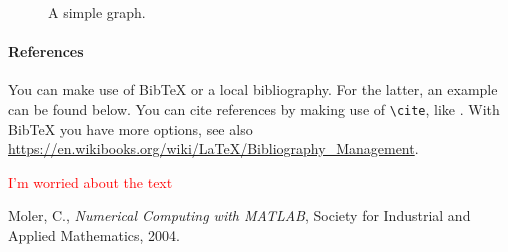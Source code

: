 \documentclass[a4paper,12pt]{article}
\newcommand\myworries[1]{\textcolor{red}{#1}}
\begin{document}
\begin{figure}[!htpb]
\centering
{
}
\caption{A simple graph.
\label{fig:simplegraph}}
\end{figure}

\paragraph{References}
You can make use of BibTeX or a local bibliography. For the latter, an example can be found below. You can cite references by making use of \texttt{\textbackslash cite}, like \cite{cmoler2004}. With BibTeX you have more options, see also \url{https://en.wikibooks.org/wiki/LaTeX/Bibliography_Management}.

\myworries{I'm worried about the text}

\newpage
\begin{thebibliography}{99} 
  Moler, C.,
  \emph{Numerical Computing with MATLAB},
  Society for Industrial and Applied Mathematics,
  2004.

\end{thebibliography}
\end{document}
